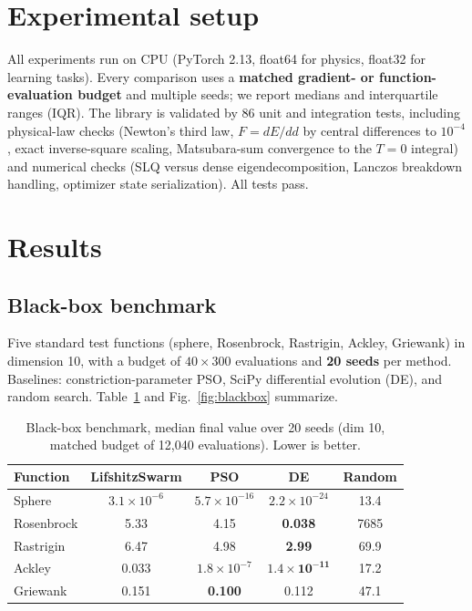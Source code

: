 \documentclass[10pt,twocolumn]{article}
\begin{document}
\section{Experimental setup}

All experiments run on CPU (PyTorch 2.13, float64 for physics, float32 for learning tasks).
Every comparison uses a \textbf{matched gradient- or function-evaluation budget} and multiple
seeds; we report medians and interquartile ranges (IQR). The library is validated by 86 unit
and integration tests, including physical-law checks (Newton's third law, $F = dE/dd$ by
central differences to $10^{-4}$, exact inverse-square scaling, Matsubara-sum convergence to
the $T\!=\!0$ integral) and numerical checks (SLQ versus dense eigendecomposition, Lanczos
breakdown handling, optimizer state serialization). All tests pass.

\section{Results}

\subsection{Black-box benchmark}
\label{sec:blackbox}

Five standard test functions (sphere, Rosenbrock, Rastrigin, Ackley, Griewank) in dimension 10,
with a budget of $40 \times 300$ evaluations and \textbf{20 seeds} per method. Baselines:
constriction-parameter PSO, SciPy differential evolution (DE), and random search.
Table~\ref{tab:blackbox} and Fig.~\ref{fig:blackbox} summarize.

\begin{table}[t]
\centering\small
\caption{Black-box benchmark, median final value over 20 seeds (dim 10, matched budget of
12{,}040 evaluations). Lower is better.}
\label{tab:blackbox}
\begin{tabular}{lcccc}
\toprule
Function & LifshitzSwarm & PSO & DE & Random \\
\midrule
Sphere     & $3.1\!\times\!10^{-6}$ & $5.7\!\times\!10^{-16}$ & $2.2\!\times\!10^{-24}$ & 13.4 \\
Rosenbrock & 5.33 & 4.15 & \textbf{0.038} & 7685 \\
Rastrigin  & 6.47 & 4.98 & \textbf{2.99} & 69.9 \\
Ackley     & 0.033 & $1.8\!\times\!10^{-7}$ & $\mathbf{1.4\!\times\!10^{-11}}$ & 17.2 \\
Griewank   & 0.151 & \textbf{0.100} & 0.112 & 47.1 \\
\bottomrule
\end{tabular}
\end{table}
\end{document}
